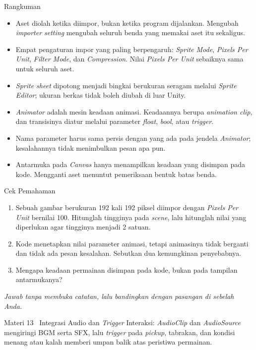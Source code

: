 \documentclass[aspectratio=169,10pt]{beamer}
\begin{document}
\begin{frame}{Rangkuman}
\begin{itemize}
  \item Aset diolah ketika diimpor, bukan ketika program dijalankan. Mengubah
        \emph{importer setting} mengubah seluruh benda yang memakai aset itu
        sekaligus.
  \item Empat pengaturan impor yang paling berpengaruh: \emph{Sprite Mode},
        \emph{Pixels Per Unit}, \emph{Filter Mode}, dan \emph{Compression}.
        Nilai \emph{Pixels Per Unit} sebaiknya sama untuk seluruh aset.
  \item \emph{Sprite sheet} dipotong menjadi bingkai berukuran seragam melalui
        \emph{Sprite Editor}; ukuran berkas tidak boleh diubah di luar Unity.
  \item \emph{Animator} adalah mesin keadaan animasi. Keadaannya berupa
        \emph{animation clip}, dan transisinya diatur melalui parameter
        \emph{float}, \emph{bool}, atau \emph{trigger}.
  \item Nama parameter harus sama persis dengan yang ada pada jendela
        \emph{Animator}; kesalahannya tidak menimbulkan pesan apa pun.
  \item Antarmuka pada \emph{Canvas} hanya menampilkan keadaan yang disimpan
        pada kode. Mengganti aset menuntut pemeriksaan bentuk batas benda.
\end{itemize}
\end{frame}

\begin{frame}{Cek Pemahaman}
\begin{enumerate}
  \item Sebuah gambar berukuran 192 kali 192 piksel diimpor dengan
        \emph{Pixels Per Unit} bernilai 100. Hitunglah tingginya pada
        \emph{scene}, lalu hitunglah nilai yang diperlukan agar tingginya
        menjadi 2 satuan.
  \item Kode menetapkan nilai parameter animasi, tetapi animasinya tidak
        berganti dan tidak ada pesan kesalahan. Sebutkan dua kemungkinan
        penyebabnya.
  \item Mengapa keadaan permainan disimpan pada kode, bukan pada tampilan
        antarmukanya?
\end{enumerate}
\vspace{0.35cm}
{\footnotesize\color{ubMuted}\itshape Jawab tanpa membuka catatan, lalu
bandingkan dengan pasangan di sebelah Anda.}
\end{frame}

  {Materi 13 \textperiodcentered\ Integrasi Audio dan \emph{Trigger} Interaksi:
   \emph{AudioClip} dan \emph{AudioSource} mengiringi BGM serta SFX, lalu
   \emph{trigger} pada \emph{pickup}, tabrakan, dan kondisi menang atau kalah
   memberi umpan balik atas peristiwa permainan.}
\end{document}
